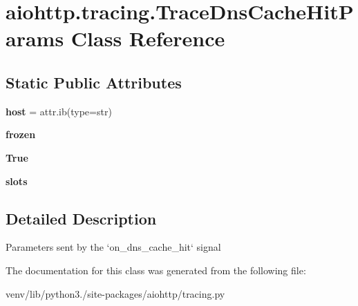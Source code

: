 \hypertarget{classaiohttp_1_1tracing_1_1_trace_dns_cache_hit_params}{}\section{aiohttp.\+tracing.\+Trace\+Dns\+Cache\+Hit\+Params Class Reference}
\label{classaiohttp_1_1tracing_1_1_trace_dns_cache_hit_params}
\subsection*{Static Public Attributes}
\begin{DoxyCompactItemize}
\item 
\mbox{\label{classaiohttp_1_1tracing_1_1_trace_dns_cache_hit_params_a269fdb77607f11ffb1069814aee1d039}} 
{\bfseries host} = attr.\+ib(type=str)
\item 
\mbox{\label{classaiohttp_1_1tracing_1_1_trace_dns_cache_hit_params_a3079123b0d37f75388f580ca27499c6f}} 
{\bfseries frozen}
\item 
\mbox{\label{classaiohttp_1_1tracing_1_1_trace_dns_cache_hit_params_ae37aa0887b2da7812a23e886db52d813}} 
{\bfseries True}
\item 
\mbox{\label{classaiohttp_1_1tracing_1_1_trace_dns_cache_hit_params_a58017c7a3d4cc7c21279842731e959c9}} 
{\bfseries slots}
\end{DoxyCompactItemize}


\subsection{Detailed Description}
\begin{DoxyVerb}Parameters sent by the `on_dns_cache_hit` signal\end{DoxyVerb}
 

The documentation for this class was generated from the following file\+:\begin{DoxyCompactItemize}
\item 
venv/lib/python3./site-\/packages/aiohttp/tracing.\+py\end{DoxyCompactItemize}
